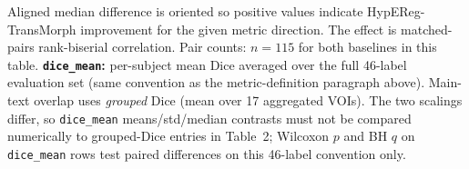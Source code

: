\documentclass[11pt,a4paper]{article}
\begin{document}
\begin{table}[H]
\begin{tabularx}{\textwidth}{llXXXX}
\bottomrule
\end{tabularx}
\parbox{\textwidth}{\footnotesize Aligned median difference is oriented so positive values indicate HypEReg-TransMorph improvement for the given metric direction. The effect is matched-pairs rank-biserial correlation. Pair counts: \(n=115\) for both baselines in this table. \textbf{\texttt{dice\_mean}:} per-subject mean Dice averaged over the full 46-label evaluation set (same convention as the metric-definition paragraph above). Main-text overlap uses \emph{grouped} Dice (mean over 17 aggregated VOIs). The two scalings differ, so \texttt{dice\_mean} means/std/median contrasts must not be compared numerically to grouped-Dice entries in Table~2; Wilcoxon \(p\) and BH \(q\) on \texttt{dice\_mean} rows test paired differences on this 46-label convention only.}
\end{table}
\end{document}
